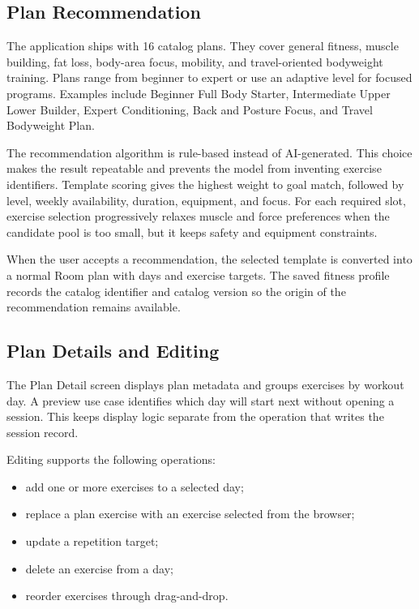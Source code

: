 \subsection{Plan Recommendation}

The application ships with 16 catalog plans. They cover general fitness, muscle building, fat loss, body-area focus, mobility, and travel-oriented bodyweight training. Plans range from beginner to expert or use an adaptive level for focused programs. Examples include Beginner Full Body Starter, Intermediate Upper Lower Builder, Expert Conditioning, Back and Posture Focus, and Travel Bodyweight Plan.

The recommendation algorithm is rule-based instead of AI-generated. This choice makes the result repeatable and prevents the model from inventing exercise identifiers. Template scoring gives the highest weight to goal match, followed by level, weekly availability, duration, equipment, and focus. For each required slot, exercise selection progressively relaxes muscle and force preferences when the candidate pool is too small, but it keeps safety and equipment constraints.

When the user accepts a recommendation, the selected template is converted into a normal Room plan with days and exercise targets. The saved fitness profile records the catalog identifier and catalog version so the origin of the recommendation remains available.

\subsection{Plan Details and Editing}

The Plan Detail screen displays plan metadata and groups exercises by workout day. A preview use case identifies which day will start next without opening a session. This keeps display logic separate from the operation that writes the session record.

Editing supports the following operations:

\begin{itemize}
    \item add one or more exercises to a selected day;
    \item replace a plan exercise with an exercise selected from the browser;
    \item update a repetition target;
    \item delete an exercise from a day;
    \item reorder exercises through drag-and-drop.
\end{itemize}

